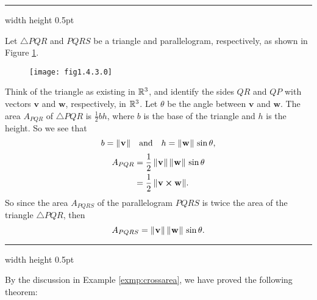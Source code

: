 \medskip
\hrule width \textwidth height 0.5pt
\begin{exmp}\label{exmp:crossarea}
 Let $\triangle PQR$ and $PQRS$ be a triangle and parallelogram, respectively, as shown in Figure \ref{fig:crossarea}.

 \begin{figure}[h]
 \begin{center}
  \texttt{[image: fig1.4.3.0]}
 \end{center}
 \caption[]{}
 \label{fig:crossarea}
\end{figure}

 Think of the triangle as existing in $\mathbb{R}^{3}$, and identify the sides $QR$ and $QP$ with vectors $\mathbf{v}$ and
 $\mathbf{w}$, respectively, in $\mathbb{R}^{3}$. 
 Let $\theta$ be the angle between $\mathbf{v}$ and $\mathbf{w}$. 
 The area
 $A_{PQR}$ of $\triangle PQR$ is $\frac{1}{2} b h$, where $b$ is the base of the triangle and $h$ is the height. So
 we see that
 \begin{displaymath}
  b = \lVert\mspace{1mu}\mathbf{v}\mspace{1mu}\rVert \quad \text{and} \quad h = \lVert\mspace{1mu}\mathbf{w}\mspace{1mu}\rVert\,\sin \theta,
 \end{displaymath}
 \begin{align*}
  A_{PQR} &= \frac{1}{2}\,\lVert\mspace{1mu}\mathbf{v}\mspace{1mu}\rVert\,\lVert\mspace{1mu}\mathbf{w}\mspace{1mu}\rVert\,\sin \theta
  \\
  &= \frac{1}{2}\,\lVert\mspace{1mu}\mathbf{v} \bm{\times} \mathbf{w}\mspace{1mu}\rVert.
 \end{align*}
 So since the area $A_{PQRS}$ of the parallelogram $PQRS$ is twice the area of the triangle $\triangle PQR$, then
 \begin{displaymath}
  A_{PQRS} = \lVert\mspace{1mu}\mathbf{v}\mspace{1mu}\rVert\,\lVert\mspace{1mu}\mathbf{w}\mspace{1mu}\rVert\,\sin \theta.
 \end{displaymath}
\end{exmp}
\hrule width \textwidth height 0.5pt
\medskip

By the discussion in Example \ref{exmp:crossarea}, we have proved the following theorem:

